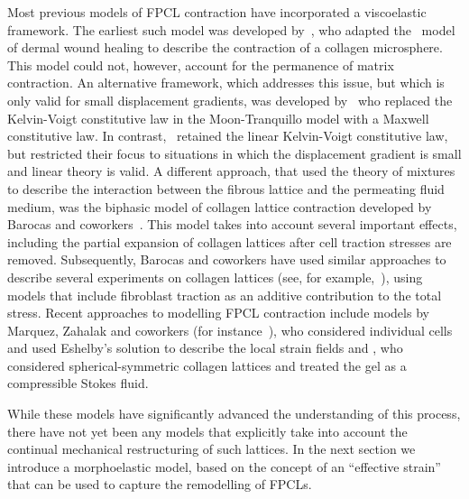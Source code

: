 Most previous models of FPCL contraction have incorporated a viscoelastic framework. The earliest such model was developed by~\citet{Moon1993}, who adapted the~\citet{Tranquillo1992} model of dermal wound healing to describe the contraction of a collagen microsphere. This model could not, however, account for the permanence of matrix contraction. An alternative framework, which addresses this issue, but which is only valid for small displacement gradients, was developed by~\citet{Barocas1995} who replaced the Kelvin-Voigt constitutive law in the Moon-Tranquillo model with a Maxwell constitutive law. In contrast,~\citet{Ferrenq1997} retained the linear Kelvin-Voigt constitutive law, but restricted their focus to situations in which the displacement gradient is small and linear theory is valid. A different approach, that used the theory of mixtures to describe the interaction between the fibrous lattice and the permeating fluid medium, was the biphasic model of collagen lattice contraction developed by Barocas and coworkers~\citep{Barocas1994,Barocas1997}. This model takes into account several important effects, including the partial expansion of collagen lattices after cell traction stresses are removed. Subsequently, Barocas and coworkers have used similar approaches to describe several experiments on collagen lattices (see, for example,~\citet{Chandran2004,Knapp1999,Schreiber2003}), using models that include fibroblast traction as an additive contribution to the total stress. Recent approaches to modelling FPCL contraction include models by Marquez, Zahalak and coworkers (for instance~\citep{Marquez2005b,Pryse2003,Zahalak2000}), who considered individual cells and used Eshelby's solution to describe the local strain fields and \citet{Green2013}, who considered spherical-symmetric collagen lattices and treated the gel as a compressible Stokes fluid.

While these models have significantly advanced the understanding of this process, there have not yet been any models that explicitly take into account the continual mechanical restructuring of such lattices. In the next section we introduce a morphoelastic model, based on the concept of an ``effective strain'' that can be used to capture the remodelling of FPCLs.


